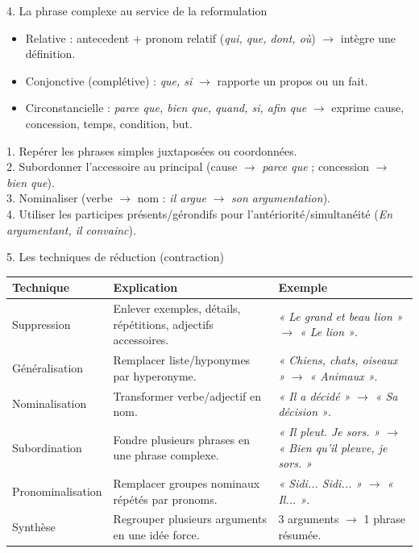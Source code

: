 \documentclass[11pt]{article}
\newcommand{\cle}[1]{{\popxbold\color{popdark}#1}}
\newcounter{popsec}
\newcounter{popsub}
\newcommand{\courssub}[1]{%
  \stepcounter{popsub}%
  \par\vspace{9pt}\noindent{\popxbold\fontsize{11.5}{13}\selectfont\color{popink}{\color{poporange}\thepopsec.\thepopsub}\hspace{6pt}#1}\par\nopagebreak\vspace{4pt}
}
\begin{document}
\begin{bilan}
\courssub*{4. La phrase complexe au service de la reformulation}
\begin{propriete}
\begin{itemize}
    \item \cle{Relative} : antecedent + pronom relatif (\emph{qui, que, dont, où}) $\rightarrow$ intègre une définition.
    \item \cle{Conjonctive (complétive)} : \emph{que, si} $\rightarrow$ rapporte un propos ou un fait.
    \item \cle{Circonstancielle} : \emph{parce que, bien que, quand, si, afin que} $\rightarrow$ exprime cause, concession, temps, condition, but.
\end{itemize}
\end{propriete}
\begin{methode}
1. Repérer les phrases simples juxtaposées ou coordonnées.\\
2. Subordonner l'accessoire au principal (cause $\rightarrow$ \emph{parce que} ; concession $\rightarrow$ \emph{bien que}).\\
3. Nominaliser (verbe $\rightarrow$ nom : \emph{il argue} $\rightarrow$ \emph{son argumentation}).\\
4. Utiliser les participes présents/gérondifs pour l'antériorité/simultanéité (\emph{En argumentant, il convainc}).
\end{methode}

\courssub*{5. Les techniques de réduction (contraction)}
\begin{center}
\begin{tabularx}{\linewidth}{|l|X|l|}\hline
\rowcolor{popblueL}\textbf{Technique} & \textbf{Explication} & \textbf{Exemple} \\ \hline
\cle{Suppression} & Enlever exemples, détails, répétitions, adjectifs accessoires. & \emph{« Le grand et beau lion »} $\rightarrow$ \emph{« Le lion »}. \\ \hline
\cle{Généralisation} & Remplacer liste/hyponymes par hyperonyme. & \emph{« Chiens, chats, oiseaux »} $\rightarrow$ \emph{« Animaux »}. \\ \hline
\cle{Nominalisation} & Transformer verbe/adjectif en nom. & \emph{« Il a décidé »} $\rightarrow$ \emph{« Sa décision »}. \\ \hline
\cle{Subordination} & Fondre plusieurs phrases en une phrase complexe. & \emph{« Il pleut. Je sors. »} $\rightarrow$ \emph{« Bien qu'il pleuve, je sors. »} \\ \hline
\cle{Pronominalisation} & Remplacer groupes nominaux répétés par pronoms. & \emph{« Sidi... Sidi... »} $\rightarrow$ \emph{« Il... »}. \\ \hline
\cle{Synthèse} & Regrouper plusieurs arguments en une idée force. & 3 arguments $\rightarrow$ 1 phrase résumée. \\ \hline
\end{tabularx}
\end{center}


\end{bilan}
\end{document}
